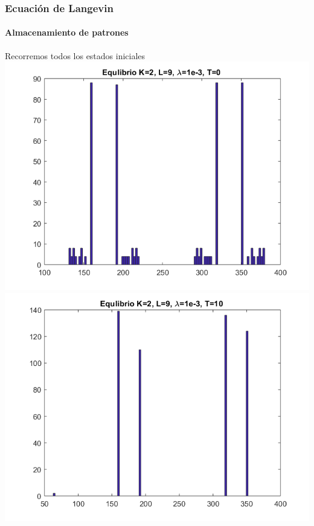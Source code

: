 \documentclass[11pt]{beamer}
\begin{document}
\begin{frame}
\frametitle{Ecuación de Langevin}
\framesubtitle{Almacenamiento de patrones}

 Recorremos todos los estados iniciales
	\includegraphics[scale=0.3]{k2l9lambda3t0}
	\includegraphics[scale=0.3]{k2l9lambda3t10}

\end{frame}
\end{document}
